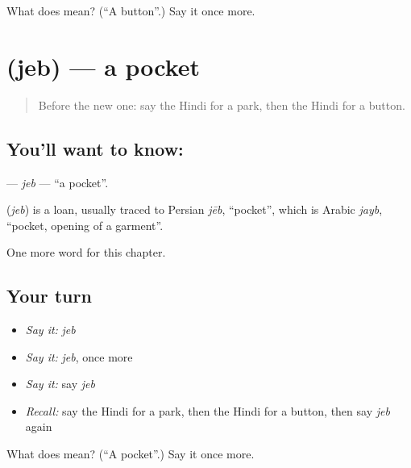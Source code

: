 \begin{tcolorbox}[breakable,colback=teal!4,colframe=teal!35!black,title={Before you move on}]
What does  mean? (\textquotedblleft{}A button\textquotedblright{}.) Say it once more.
\end{tcolorbox}
\section[\texorpdfstring{\hi{जेब} (jeb)}{जेब (jeb)}]{ (jeb) — a pocket}

\label{lesson:HI-C188-jeb}



\begin{quote}
Before the new one: say the Hindi for a park, then the Hindi for a button.
\end{quote}

\subsection*{You'll want to know: }
\textbf{} — \emph{jeb} — \textquotedblleft{}a pocket\textquotedblright{}.

\begin{cousinweb}
\textbf{} (\emph{jeb}) is a loan, usually traced to Persian \emph{jēb}, \textquotedblleft{}pocket\textquotedblright{}, which is Arabic \emph{jayb}, \textquotedblleft{}pocket, opening of a garment\textquotedblright{}.
\end{cousinweb}

\begin{grammarlens}[title={What you've built}]
One more word for this chapter.
\end{grammarlens}

\subsection*{Your turn}
\begin{itemize}
\raggedright
  \item \emph{Say it:} \emph{jeb}
  \item \emph{Say it:} \emph{jeb}, once more
  \item \emph{Say it:} say \emph{jeb}
  \item \emph{Recall:} say the Hindi for a park, then the Hindi for a button, then say \emph{jeb} again
\end{itemize}

\begin{tcolorbox}[breakable,colback=teal!4,colframe=teal!35!black,title={Before you move on}]
What does  mean? (\textquotedblleft{}A pocket\textquotedblright{}.) Say it once more.
\end{tcolorbox}
